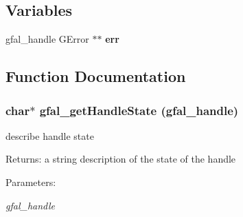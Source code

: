\subsection*{Variables}
\begin{CompactItemize}
\item 
gfal\_\-handle GError $\ast$$\ast$ \textbf{err}\label{group__srm__group_g59682e65b5e0d894f654c64d3a19aecd}

\end{CompactItemize}


\subsection{Function Documentation}
\subsubsection{\setlength{\rightskip}{0pt plus 5cm}char$\ast$ gfal\_\-get\-Handle\-State (gfal\_\-handle)}\label{group__srm__group_gb850010181be27c87a5c5b0341412655}


describe handle state 

\begin{Desc}
\item[Returns:]a string description of the state of the handle \end{Desc}
\begin{Desc}
\item[Parameters:]
\begin{description}
\item[{\em gfal\_\-handle}]\end{description}
\end{Desc}
